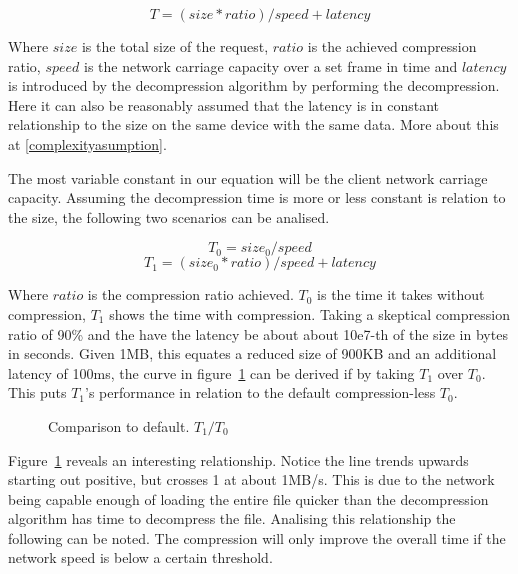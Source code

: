 \documentclass[11pt,a4paper]{report}
\begin{document}
\begin{equation}
T = (size * ratio) / speed + latency
\label{networkfun}
\end{equation}

Where $size$ is the total size of the request, $ratio$ is the achieved compression ratio, $speed$ is the network carriage capacity over a set frame in time and  $latency$ is introduced by the decompression algorithm by performing the decompression. Here it can also be reasonably assumed that the latency is in constant relationship to the size on the same device with the same data. More about this at \ref{complexityasumption}.

The most variable constant in our equation will be the client network carriage capacity. Assuming the decompression time is more or less constant is relation to the size, the following two scenarios can be analised.

\begin{equation}
T_0 = size_0 / speed
\label{networkfundefault}
\end{equation}
\begin{equation}
T_1 = (size_0 * ratio) / speed + latency
\end{equation}

Where $ratio$ is the compression ratio achieved. $T_0$ is the time it takes without compression, $T_1$ shows the time with compression. Taking a skeptical compression ratio of 90\% and the have the latency be about about 10e7-th of the size in bytes in seconds. Given 1MB, this equates a reduced size of 900KB and an additional latency of 100ms, the curve in figure~\ref{fig:CurveNetworkLimitationSpeed} can be derived if by taking $T_1$ over $T_0$. This puts $T_1$'s performance in relation to the default compression-less $T_0$.

\begin{figure}[ht!]
    \centering
{}
\caption{
\label{fig:CurveNetworkLimitationSpeed} Comparison to default. $T_1 / T_0$}
\end{figure}

Figure~\ref{fig:CurveNetworkLimitationSpeed} reveals an interesting relationship. Notice the line trends upwards starting out positive, but crosses 1 at about 1MB/s. This is due to the network being capable enough of loading the entire file quicker than the decompression algorithm has time to decompress the file. Analising this relationship the following can be noted. The compression will only improve the overall time if the network speed is below a certain threshold.
\end{document}
